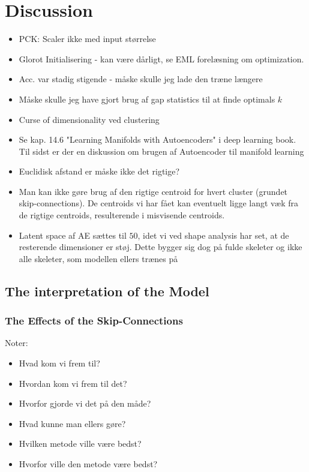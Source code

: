 \documentclass[./main.tex]{subfiles}
\begin{document}
\section{Discussion}\label{sec:discussion}
\begin{itemize}
    \item PCK: Scaler ikke med input størrelse
    \item Glorot Initialisering - kan være dårligt, se EML forelæsning om optimization.
    \item Acc. var stadig stigende - måske skulle jeg lade den træne længere
    \item Måske skulle jeg have gjort brug af gap statistics til at finde optimals $k$
    \item Curse of dimensionality ved clustering
    \item Se kap. 14.6 "Learning Manifolds with Autoencoders" i deep learning book. Til sidst er der en diskussion om brugen af Autoencoder til manifold learning
    \item Euclidisk afstand er måske ikke det rigtige?
    \item Man kan ikke gøre brug af den rigtige centroid for hvert cluster (grundet skip-connections). De centroids vi har fået kan eventuelt ligge langt væk fra de rigtige centroids, resulterende i misvisende centroids.
    \item Latent space af AE sættes til $50$, idet vi ved shape analysis har set, at de resterende dimensioner er støj. Dette bygger sig dog på fulde skeleter og ikke alle skeleter, som modellen ellers trænes på
\end{itemize}

\subsection{The interpretation of the Model}
\subsubsection{The Effects of the Skip-Connections}
Noter:
\begin{itemize}
    \item Hvad kom vi frem til?
    \item Hvordan kom vi frem til det?
    \item Hvorfor gjorde vi det på den måde?
    \item Hvad kunne man ellers gøre?
    \item Hvilken metode ville være bedst?
    \item Hvorfor ville den metode være bedst?
\end{itemize}
\end{document}

